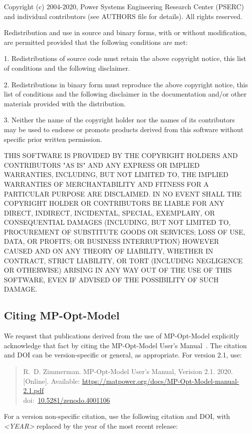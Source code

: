 \documentclass[12pt]{article}
\newcommand{\mpom}[0]{\mbox{MP-Opt-Model}}
\newcommand{\mpomname}[0]{\mpom{}}
\newcommand{\doi}[1]{doi:~\href{https://doi.org/#1}{#1}}
\numberwithin{equation}{section}
\numberwithin{table}{section}
\numberwithin{figure}{section}
\begin{document}
\begin{Notice}
Copyright (c) 2004-2020, Power Systems Engineering Research Center
(PSERC) and individual contributors (see AUTHORS file for details).
All rights reserved.

Redistribution and use in source and binary forms, with or without
modification, are permitted provided that the following conditions
are met:

1. Redistributions of source code must retain the above copyright
notice, this list of conditions and the following disclaimer.

2. Redistributions in binary form must reproduce the above copyright
notice, this list of conditions and the following disclaimer in the
documentation and/or other materials provided with the distribution.

3. Neither the name of the copyright holder nor the names of its
contributors may be used to endorse or promote products derived from
this software without specific prior written permission.

THIS SOFTWARE IS PROVIDED BY THE COPYRIGHT HOLDERS AND CONTRIBUTORS
"AS IS" AND ANY EXPRESS OR IMPLIED WARRANTIES, INCLUDING, BUT NOT
LIMITED TO, THE IMPLIED WARRANTIES OF MERCHANTABILITY AND FITNESS
FOR A PARTICULAR PURPOSE ARE DISCLAIMED. IN NO EVENT SHALL THE
COPYRIGHT HOLDER OR CONTRIBUTORS BE LIABLE FOR ANY DIRECT, INDIRECT,
INCIDENTAL, SPECIAL, EXEMPLARY, OR CONSEQUENTIAL DAMAGES (INCLUDING,
BUT NOT LIMITED TO, PROCUREMENT OF SUBSTITUTE GOODS OR SERVICES;
LOSS OF USE, DATA, OR PROFITS; OR BUSINESS INTERRUPTION) HOWEVER
CAUSED AND ON ANY THEORY OF LIABILITY, WHETHER IN CONTRACT, STRICT
LIABILITY, OR TORT (INCLUDING NEGLIGENCE OR OTHERWISE) ARISING IN
ANY WAY OUT OF THE USE OF THIS SOFTWARE, EVEN IF ADVISED OF THE
POSSIBILITY OF SUCH DAMAGE.
\end{Notice}

\clearpage
\subsection{Citing \mpom{}}

We request that publications derived from the use of \mpom{} explicitly acknowledge that fact by citing the \mpomname{} User's Manual~\cite{mpom_manual}.
The citation and DOI can be version-specific or general, as appropriate. For version 2.1, use:

\begin{quote}
\footnotesize
R.~D. Zimmerman. \mpomname{} User's Manual, Verision 2.1. 2020. [Online]. Available: \url{https://matpower.org/docs/MP-Opt-Model-manual-2.1.pdf}\\
\doi{10.5281/zenodo.4001106}
\end{quote}
For a version non-specific citation, use the following citation and DOI,
with \emph{\textless{}YEAR\textgreater{}} replaced by the year of the most recent release:
\end{document}
